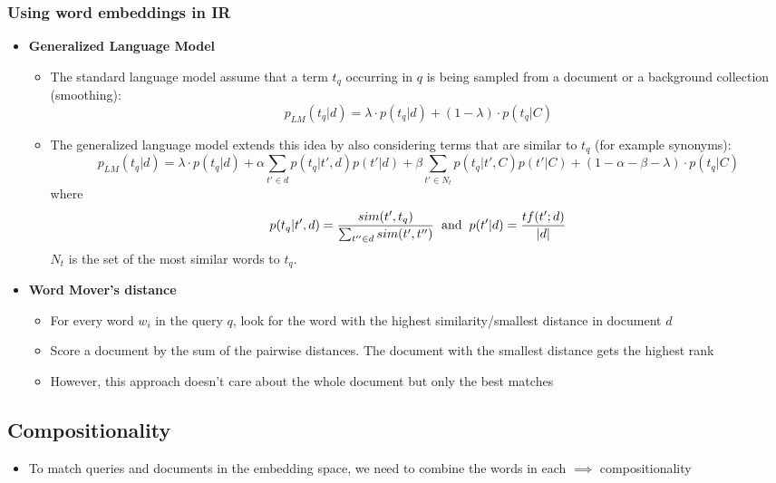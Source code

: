 \subsubsection{Using word embeddings in IR}
\begin{itemize}
	\item \textbf{Generalized Language Model}
	\begin{itemize}
		\item The standard language model assume that a term $t_q$ occurring in $q$ is being sampled from a document or a background collection (smoothing):
		$$p_{LM}(t_q|d) = \lambda \cdot p(t_q|d) + (1 - \lambda) \cdot p(t_q|C)$$
		\item The generalized language model extends this idea by also considering terms that are similar to $t_q$ (for example synonyms):
		$$p_{LM}(t_q|d) = \lambda \cdot p(t_q|d) + \alpha \sum\limits_{t'\in d} p(t_q|t',d) p(t'|d) + \beta \sum\limits_{t' \in N_t} p(t_q|t',C) p(t'|C) + (1 - \alpha - \beta - \lambda) \cdot p(t_q|C)$$
		where $$p(t_q|t',d) = \frac{sim(t',t_q)}{\sum_{t''\in d} sim(t',t'')} \text{\hspace{2mm}and\hspace{2mm}} p(t'|d) = \frac{tf(t';d)}{|d|}$$
		$N_t$ is the set of the most similar words to $t_q$.
	\end{itemize}
	\item \textbf{Word Mover's distance}
	\begin{itemize}
		\item For every word $w_i$ in the query $q$, look for the word with the highest similarity/smallest distance in document $d$
		\item Score a document by the sum of the pairwise distances. The document with the smallest distance gets the highest rank
		\item However, this approach doesn't care about the whole document but only the best matches
	\end{itemize}
\end{itemize}
\subsection{Compositionality}
\begin{itemize}
	\item To match queries and documents in the embedding space, we need to combine the words in each $\implies$ compositionality
\end{itemize}
